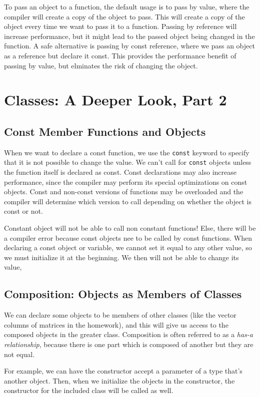 \documentclass{article}
\begin{document}
To pass an object to a function, the default usage is to pass by value, where the compiler will create a copy
of the object to pass. This will create a copy of the object every time we want to pass it to a function. Passing
by reference will increase performance, but it might lead to the passed object being changed in the function.
A safe alternative is passing by const reference, where we pass an object as a reference but declare it const. 
This provides the performance benefit of passing by value, but elminates the risk of changing the object.
\newpage
\section{Classes: A Deeper Look, Part 2}
\subsection{Const Member Functions and Objects}
When we want to declare a const function, we use the \texttt{const} keyword to specify that it is not possible
to change the value. We can't call for \texttt{const} objects unless the function itself is declared as const. 
Const declarations may also increase performance, since the compiler may perform its special optimizations
on const objects. Const and non-const versions of functions may be overloaded and the compiler will determine
which version to call depending on whether the object is const or not.

Constant object will not be able to call non constant functions! Else, there will be a compiler error because 
const objects nee to be called by const functions. When declaring a const object or variable, we cannot 
set it equal to any other value, so we must initialize it at the beginning. We then will not be able to 
change its value,
\subsection{Composition: Objects as Members of Classes}

We can declare some objects to be members of other classes (like the vector columns of matrices in the homework),
and this will give us access to the composed objects in the greater class. Composition is often referred to as 
a \textit{has-a relationship}, because there is one part which is composed of another but they are not equal.

For example, we can have the constructor accept a parameter of a type that's another object. Then, when we 
initialize the objects in the constructor, the constructor for the included class will be called as well.
\end{document}
